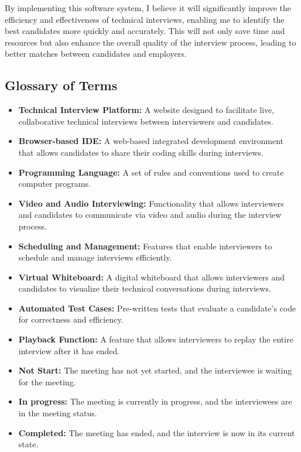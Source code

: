 \documentclass{article}
\begin{document}
By implementing this software system, I believe it will significantly improve the efficiency and effectiveness of technical interviews, enabling me to identify the best candidates more quickly and accurately. This will not only save time and resources but also enhance the overall quality of the interview process, leading to better matches between candidates and employers.

\subsection{Glossary of Terms}

\begin{itemize}
  \item \textbf{Technical Interview Platform:} A website designed to facilitate live, collaborative technical interviews between interviewers and candidates. 
  \item \textbf{Browser-based IDE:} A web-based integrated development environment that allows candidates to share their coding skills during interviews. 
  \item \textbf{Programming Language:} A set of rules and conventions used to create computer programs. 
  \item \textbf{Video and Audio Interviewing:} Functionality that allows interviewers and candidates to communicate via video and audio during the interview process. 
  \item \textbf{Scheduling and Management:} Features that enable interviewers to schedule and manage interviews efficiently. 
  \item \textbf{Virtual Whiteboard:} A digital whiteboard that allows interviewers and candidates to visualize their technical conversations during interviews. 
  \item \textbf{Automated Test Cases:} Pre-written tests that evaluate a candidate’s code for correctness and efficiency. 
  \item \textbf{Playback Function:} A feature that allows interviewers to replay the entire interview after it has ended. 
  \item \textbf{Not Start:} The meeting has not yet started, and the interviewee is waiting for the meeting.
  \item \textbf{In progress:} The meeting is currently in progress, and the interviewees are in the meeting status.
  \item \textbf{Completed:} The meeting has ended, and the interview is now in its current state.
\end{itemize}
\end{document}

